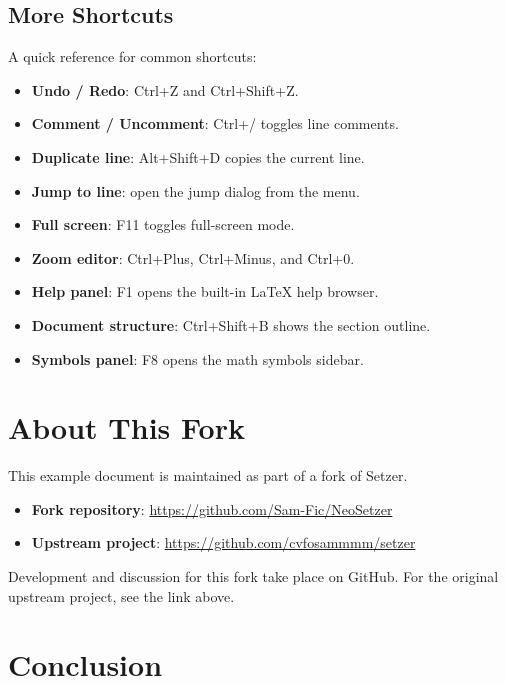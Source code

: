 \documentclass[11pt]{article}
\newcommand{\menu}[1]{\textsf{#1}}
\theoremstyle{definition}
\theoremstyle{plain}
\begin{document}
\subsection{More Shortcuts}
\label{sec:setzer:shortcuts-more}

A quick reference for common shortcuts:

\begin{itemize}[noitemsep]
    \item \textbf{Undo / Redo}: \menu{Ctrl+Z} and \menu{Ctrl+Shift+Z}.
    \item \textbf{Comment / Uncomment}: \menu{Ctrl+/} toggles line comments.
    \item \textbf{Duplicate line}: \menu{Alt+Shift+D} copies the current line.
    \item \textbf{Jump to line}: open the jump dialog from the menu.
    \item \textbf{Full screen}: \menu{F11} toggles full-screen mode.
    \item \textbf{Zoom editor}: \menu{Ctrl+Plus}, \menu{Ctrl+Minus}, and \menu{Ctrl+0}.
    \item \textbf{Help panel}: \menu{F1} opens the built-in LaTeX help browser.
    \item \textbf{Document structure}: \menu{Ctrl+Shift+B} shows the section outline.
    \item \textbf{Symbols panel}: \menu{F8} opens the math symbols sidebar.
\end{itemize}


\section{About This Fork}
\label{sec:about}

This example document is maintained as part of a fork of Setzer.

\begin{itemize}[noitemsep]
    \item \textbf{Fork repository}: \url{https://github.com/Sam-Fic/NeoSetzer}
    \item \textbf{Upstream project}: \url{https://github.com/cvfosammmm/setzer}
\end{itemize}

Development and discussion for this fork take place on GitHub.
For the original upstream project, see the link above.

\section{Conclusion}
\label{sec:conclusion}
\end{document}
